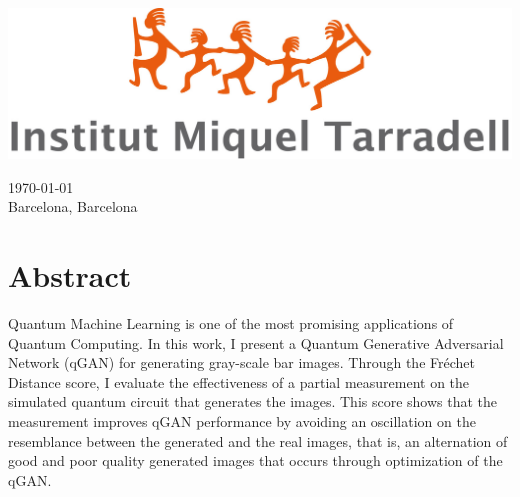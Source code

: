 \documentclass[a4paper,12pt,arial,numbered,print,index,oneside]{book}
\newcommand\blankpage{%
	\null
	\thispagestyle{empty}%
	\addtocounter{page}{-1}%
	\newpage}
\begin{document}
\begin{titlepage}
\begin{center}
\begin{singlespace}
		\vspace{1.5cm}
		\begin{minipage}{0.85\textwidth}
			\begin{center}
								\includegraphics[scale=0.2]{Figures/Cover/logo-tarradell.jpg}
			\end{center}
		\end{minipage}
		
		\vspace{.3cm}
		
		
		{\large \today} \\
		\large Barcelona, Barcelona  
		
		
		\vfill %
		\end{singlespace}
		\end{center}
		
	\end{titlepage}
	
	
	\afterpage{\blankpage}
	\begin{onehalfspacing}
		\tableofcontents
	\end{onehalfspacing}
	
	\clearpage
	
	\thispagestyle{plain}
	
	\section*{Abstract}
	Quantum Machine Learning is one of the most promising applications of Quantum Computing. In this work, I present a Quantum Generative Adversarial Network (qGAN) for generating gray-scale bar images. Through the Fréchet Distance score, I evaluate the effectiveness of a partial measurement on the simulated quantum circuit that generates the images. This score shows that the measurement improves qGAN performance by avoiding an oscillation on the resemblance between the generated and the real images, that is, an alternation of good and poor quality generated images that occurs through optimization of the qGAN. 
\end{document}
